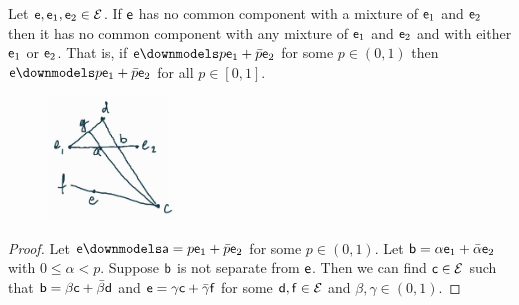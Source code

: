 \begin{mathSection}
\begin{prop}\label{pm_es_separateExtendsMixtures}
	Let $\ens,\ens_1,\ens_2 \in \Ens$. If $\ens$ has no common component with a mixture of $\ens_1$ and $\ens_2$ then it has no common component with any mixture of $\ens_1$ and $\ens_2$ and with either $\ens_1$ or $\ens_2$. That is, if $\ens \separate p \ens_1 + \bar{p} \ens_2$ for some $p \in (0, 1)$ then $\ens \separate p \ens_1 + \bar{p} \ens_2$ for all $p \in [0, 1]$.
\end{prop}

\begin{figure}[H]
	\centering
	\includegraphics[width=0.3\textwidth]{tempimages/DistinctAndMixture.jpg}
\end{figure}

\begin{proof}
	Let $\ens \separate \ens[a] = p \ens_1 + \bar{p} \ens_2$ for some $p \in (0, 1)$. Let $\ens[b] = \alpha \ens_1 + \bar{\alpha} \ens_2$ with $0 \leq \alpha < p$. Suppose $\ens[b]$ is not separate from $\ens$. Then we can find $\ens[c] \in \Ens$ such that $\ens[b] = \beta \ens[c] + \bar{\beta} \ens[d]$ and $\ens = \gamma \ens[c] + \bar{\gamma} \ens[f]$ for some $\ens[d], \ens[f] \in \Ens$ and $\beta, \gamma \in (0, 1)$.
	

\end{proof}
\end{mathSection}
